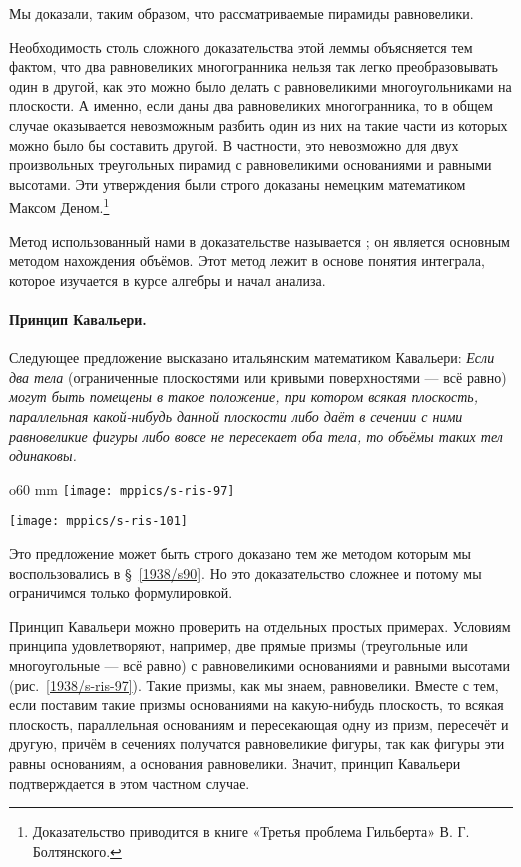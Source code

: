 Мы доказали, таким образом, что рассматриваемые пирамиды равновелики.

\medskip

Необходимость столь сложного доказательства этой леммы объясняется тем фактом, что два равновеликих многогранника нельзя так легко преобразовывать один в другой, как это можно было делать с равновеликими многоугольниками на плоскости.
А именно, если даны два равновеликих многогранника, то в общем случае оказывается невозможным разбить один из них на такие части из которых можно было бы составить другой.
В частности, это невозможно для двух произвольных треугольных пирамид с равновеликими основаниями и равными высотами.
Эти утверждения были строго доказаны немецким математиком Максом Деном.\footnote{Доказательство приводится в книге «Третья проблема Гильберта» В. Г. Болтянского.}

Метод использованный нами в доказательстве называется ; он является основным методом нахождения объёмов.
Этот метод лежит в основе понятия интеграла, которое изучается в курсе алгебры и начал анализа.

\paragraph{Принцип Кавальери.}\label{1938/s89} 
Следующее предложение высказано итальянским математиком Кавальери:
\emph{Если два тела} (ограниченные плоскостями или кривыми поверхностями — всё равно) \emph{могут быть помещены в такое положение, при котором всякая плоскость, параллельная какой-нибудь данной плоскости либо даёт в сечении с ними равновеликие фигуры либо вовсе не пересекает оба тела, то объёмы таких тел одинаковы.}

\begin{wrapfigure}{o}{60 mm}
\vskip-0mm
\centering
\texttt{[image: mppics/s-ris-97]}
\caption{}\label{1938/s-ris-97}
\bigskip
\texttt{[image: mppics/s-ris-101]}
\caption{}\label{1938/s-ris-101}%
\vskip-0mm
\end{wrapfigure}

Это предложение может быть строго доказано тем же методом которым мы воспользовались в §~\ref{1938/s90}.
Но это доказательство сложнее и потому мы ограничимся только формулировкой.

Принцип Кавальери можно проверить на отдельных простых примерах.
Условиям принципа удовлетворяют, например, две прямые призмы (треугольные или многоугольные — всё равно) с равновеликими основаниями и равными высотами (рис.~\ref{1938/s-ris-97}).
Такие призмы, как мы знаем, равновелики.
Вместе с тем, если поставим такие призмы основаниями на какую-нибудь плоскость, то всякая плоскость, параллельная основаниям и пересекающая одну из призм, пересечёт и другую, причём в сечениях получатся равновеликие фигуры, так как фигуры эти равны основаниям, а основания равновелики.
Значит, принцип Кавальери подтверждается в этом частном случае.

